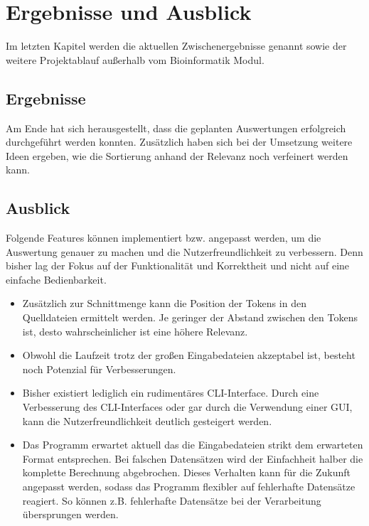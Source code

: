 \documentclass[a4paper,10pt]{article}
\begin{document}
\section{Ergebnisse und Ausblick}
    Im letzten Kapitel werden die aktuellen Zwischenergebnisse genannt sowie der weitere Projektablauf außerhalb vom Bioinformatik Modul.

    \subsection{Ergebnisse}
        Am Ende hat sich herausgestellt, dass die geplanten Auswertungen erfolgreich durchgeführt werden konnten. Zusätzlich haben sich bei der Umsetzung weitere Ideen ergeben, wie die Sortierung anhand der Relevanz noch verfeinert werden kann.

    \subsection{Ausblick}
        Folgende Features können implementiert bzw. angepasst werden, um die Auswertung genauer zu machen und die Nutzerfreundlichkeit zu verbessern. Denn bisher lag der Fokus auf der Funktionalität und Korrektheit und nicht auf eine einfache Bedienbarkeit.
        \begin{itemize}
            \item Zusätzlich zur Schnittmenge kann die Position der Tokens in den Quelldateien ermittelt werden. Je geringer der Abstand zwischen den Tokens ist, desto wahrscheinlicher ist eine höhere Relevanz.
            \item Obwohl die Laufzeit trotz der großen Eingabedateien akzeptabel ist, besteht noch Potenzial für Verbesserungen.
            \item Bisher existiert lediglich ein rudimentäres CLI-Interface. Durch eine Verbesserung des CLI-Interfaces oder gar durch die Verwendung einer GUI, kann die Nutzerfreundlichkeit deutlich gesteigert werden.
            \item Das Programm erwartet aktuell das die Eingabedateien strikt dem erwarteten Format entsprechen. Bei falschen Datensätzen wird der Einfachheit halber die komplette Berechnung abgebrochen. Dieses Verhalten kann für die Zukunft angepasst werden, sodass das Programm flexibler auf fehlerhafte Datensätze reagiert. So können z.B. fehlerhafte Datensätze bei der Verarbeitung übersprungen werden.
        \end{itemize}
\end{document}
